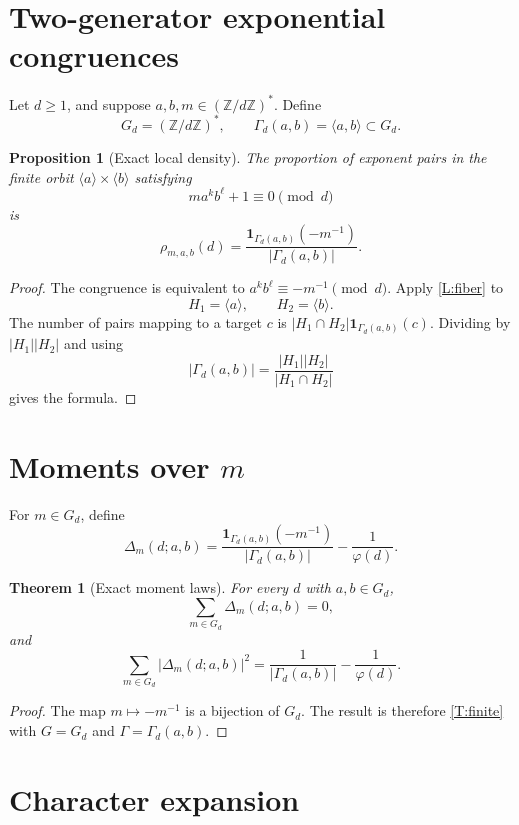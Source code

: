 \documentclass[11pt]{article}
\newtheorem{theorem}{Theorem}
\newtheorem{proposition}{Proposition}
\newcommand{\Z}{\mathbb Z}
\newcommand{\1}{\mathbf 1}
\begin{document}
\section{Two-generator exponential congruences}

Let \(d\ge1\), and suppose \(a,b,m\in(\Z/d\Z)^*\).  Define
\[
G_d=(\Z/d\Z)^*,\qquad \Gamma_d(a,b)=\langle a,b\rangle\subset G_d.
\]

\begin{proposition}[Exact local density]\label{P:localdensity}
The proportion of exponent pairs in the finite orbit \(\langle a\rangle\times\langle b\rangle\) satisfying
\[
m a^k b^\ell+1\equiv0\pmod d
\]
is
\[
\rho_{m,a,b}(d)=
\frac{\1_{\Gamma_d(a,b)}(-m^{-1})}{|\Gamma_d(a,b)|}.
\]
\end{proposition}

\begin{proof}
The congruence is equivalent to \(a^k b^\ell\equiv -m^{-1}\pmod d\).  Apply \cref{L:fiber} to
\[
H_1=\langle a\rangle,\qquad H_2=\langle b\rangle.
\]
The number of pairs mapping to a target \(c\) is \(|H_1\cap H_2|\1_{\Gamma_d(a,b)}(c)\).  Dividing by \(|H_1||H_2|\) and using
\[
|\Gamma_d(a,b)|=\frac{|H_1||H_2|}{|H_1\cap H_2|}
\]
gives the formula.
\end{proof}

\section{Moments over \texorpdfstring{\(m\)}{m}}

For \(m\in G_d\), define
\[
\Delta_m(d;a,b)=
\frac{\1_{\Gamma_d(a,b)}(-m^{-1})}{|\Gamma_d(a,b)|}
-
\frac1{\varphi(d)}.
\]

\begin{theorem}[Exact moment laws]\label{T:moments}
For every \(d\) with \(a,b\in G_d\),
\[
\sum_{m\in G_d}\Delta_m(d;a,b)=0,
\]
and
\[
\sum_{m\in G_d}|\Delta_m(d;a,b)|^2
=
\frac1{|\Gamma_d(a,b)|}-\frac1{\varphi(d)}.
\]
\end{theorem}

\begin{proof}
The map \(m\mapsto -m^{-1}\) is a bijection of \(G_d\).  The result is therefore \cref{T:finite} with \(G=G_d\) and \(\Gamma=\Gamma_d(a,b)\).
\end{proof}

\section{Character expansion}
\end{document}
